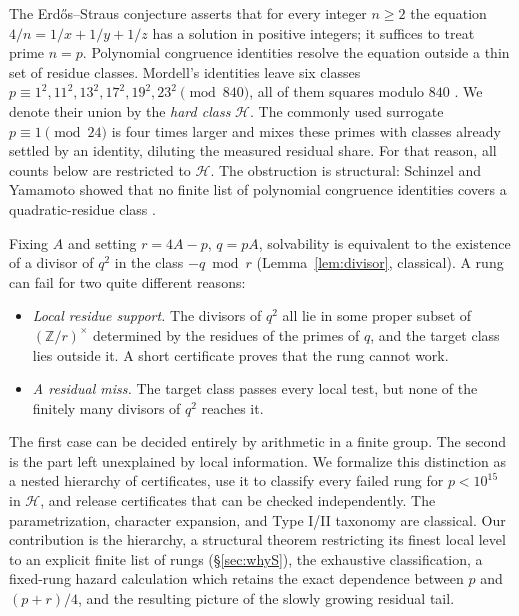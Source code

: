 \documentclass[11pt]{article}
\theoremstyle{definition}
\theoremstyle{remark}
\begin{document}
The Erd\H{o}s--Straus conjecture \cite{Erdos1950} asserts that for every integer
$n \ge 2$ the equation $4/n = 1/x + 1/y + 1/z$ has a solution in positive integers; it
suffices to treat prime $n = p$. Polynomial congruence identities resolve the equation
outside a thin set of residue classes. Mordell's identities leave six classes
$p \equiv 1^2, 11^2, 13^2, 17^2, 19^2, 23^2 \pmod{840}$, all of them squares modulo
$840$ \cite{Mordell1969}. We denote their union by the \emph{hard class}
$\mathcal{H}$. The commonly used surrogate $p\equiv1\pmod{24}$ is four times larger and mixes
these primes with classes already settled by an identity, diluting the measured
residual share. For that reason, all counts below are restricted to $\mathcal{H}$.
The obstruction is structural: Schinzel and Yamamoto showed
that no finite list of polynomial congruence identities covers a quadratic-residue
class \cite{Schinzel2000,Yamamoto1965}.

Fixing $A$ and setting $r = 4A - p$, $q = pA$, solvability is equivalent to the existence of a
divisor of $q^2$ in the class $-q \bmod r$ (Lemma~\ref{lem:divisor}, classical).
A rung can fail for two quite different reasons:

\begin{itemize}
\item \emph{Local residue support.} The divisors of $q^2$ all lie in some proper
subset of $(\mathbb{Z}/r)^\times$ determined by the residues of the primes of $q$, and
the target class lies outside it. A short certificate proves that the rung cannot work.
\item \emph{A residual miss.} The target class passes every local test, but none of the
finitely many divisors of $q^2$ reaches it.
\end{itemize}

The first case can be decided entirely by arithmetic in a finite group. The second is
the part left unexplained by local information. We formalize this distinction as a
nested hierarchy of certificates, use it to classify every failed rung for
$p<10^{15}$ in $\mathcal{H}$, and release certificates that can be checked
independently. The parametrization, character expansion, and Type I/II taxonomy are
classical. Our contribution is the hierarchy, a structural theorem restricting its
finest local level to an explicit finite list of rungs (\S\ref{sec:whyS}), the
exhaustive classification, a fixed-rung hazard calculation which retains the exact
dependence between $p$ and $(p+r)/4$, and the resulting picture of the slowly growing
residual tail.
\end{document}
